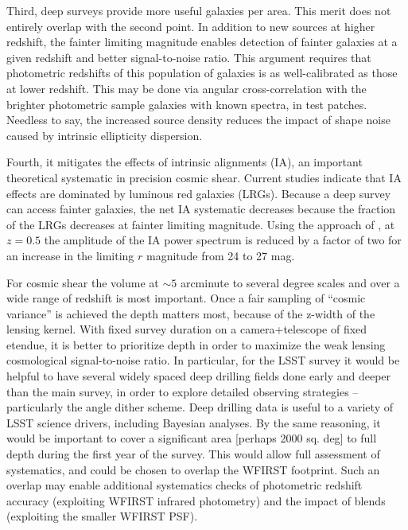 
Third, deep surveys provide more useful galaxies per area.  This merit does not
entirely overlap with the second point.  In addition to new sources at higher
redshift, the fainter limiting magnitude enables detection of fainter galaxies
at a given redshift and better signal-to-noise ratio.  This argument requires
that photometric redshifts of this population of galaxies is as well-calibrated
as those at lower redshift.  This may be done via angular cross-correlation with
the brighter photometric sample galaxies with known spectra, in test patches.
Needless to say, the increased source density reduces the impact of shape noise
caused by intrinsic ellipticity dispersion.

Fourth, it mitigates the effects of intrinsic alignments (IA), an important
theoretical systematic in precision cosmic shear.  Current studies
\citep{Heymans2013} indicate that IA effects are dominated by luminous red
galaxies (LRGs).  Because a deep survey can access fainter galaxies, the net IA
systematic decreases because the fraction of the LRGs decreases at fainter
limiting magnitude.  Using the approach of \citet{Joachimi2011}, at $z = 0.5$
the amplitude of the IA power spectrum is reduced by a factor of two for an
increase in the limiting $r$ magnitude from 24 to 27 mag.

For cosmic shear the volume at $\sim 5$ arcminute to several degree scales and
over a wide range of redshift is most important.  Once a fair sampling of
“cosmic variance” is achieved the depth matters most, because of the z-width of
the lensing kernel.  With fixed survey duration on a camera+telescope of fixed
etendue, it is better to prioritize depth in order to maximize the weak lensing
cosmological signal-to-noise ratio.  In particular, for the LSST survey it would
be helpful to have several widely spaced deep drilling fields done early and
deeper than the main survey, in order to explore detailed observing strategies --
particularly the angle dither scheme.  Deep drilling data is useful to a variety
of LSST science drivers, including Bayesian analyses.  By the same reasoning, it
would be important to cover a significant area [perhaps 2000 sq. deg] to full
depth during the first year of the survey.  This would allow full assessment of
systematics, and could be chosen to overlap the WFIRST footprint.  Such an
overlap may enable additional systematics checks of photometric redshift accuracy
(exploiting WFIRST infrared photometry) and the impact of blends (exploiting the
smaller WFIRST PSF).

